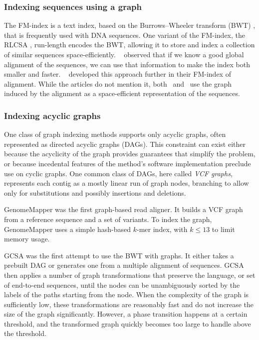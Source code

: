 \subsubsection{Indexing sequences using a graph}

The FM-index \cite{Ferragina_2005} is a text index, based on the Burrows--Wheeler transform (BWT) \cite{Burrows_1994}, that is frequently used with DNA sequences.
One variant of the FM-index, the RLCSA \cite{Maekinen_2010}, run-length encodes the BWT, allowing it to store and index a collection of similar sequences space-efficiently.
\citeauthor{Huang_2010}\ \cite{Huang_2010} observed that if we know a good global alignment of the sequences, we can use that information to make the index both smaller and faster.
\citeauthor{Na_2016}\ \cite{Na_2016,Na_2018} developed this approach further in their FM-index of alignment.
While the articles do not mention it, both \citeauthor{Huang_2010}\ and \citeauthor{Na_2016}\ use the graph induced by the alignment as a space-efficient representation of the sequences.

\subsubsection{Indexing acyclic graphs}

One class of graph indexing methods supports only acyclic graphs, often represented as directed acyclic graphs (DAGs).
This constraint can exist either because the acyclicity of the graph provides guarantees that simplify the problem, or because incedental features of the method's software implementation preclude use on cyclic graphs.
One common class of DAGs, here called \emph{VCF graphs}, represents each contig as a mostly linear run of graph nodes, branching to allow only for substitutions and possibly insertions and deletions.

GenomeMapper \cite{Schneeberger_2009} was the first graph-based read aligner.
It builds a VCF graph from a reference sequence and a set of variants.
To index the graph, GenomeMapper uses a simple hash-based $k$-mer index, with $k \le 13$ to limit memory usage.

GCSA \cite{Siren_2014} was the first attempt to use the BWT with graphs.
It either takes a prebuilt DAG or generates one from a multiple alignment of sequences.
GCSA then applies a number of graph transformations that preserve the language, or set of end-to-end sequences, until the nodes can be unambiguously sorted by the labels of the paths starting from the node.
When the complexity of the graph is sufficiently low, these transformations are reasonably fast and do not increase the size of the graph significantly.
However, a phase transition happens at a certain threshold, and the transformed graph quickly becomes too large to handle above the threshold.

